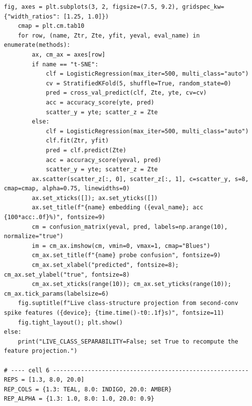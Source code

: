 \begin{lstlisting}[caption={experiments/temporal\_storerecall.ipynb},label={lst:mnn-nb-temporal-storerecall}]
    fig, axes = plt.subplots(3, 2, figsize=(7.5, 9.2), gridspec_kw={"width_ratios": [1.25, 1.0]})
    cmap = plt.cm.tab10
    for row, (name, Ztr, Zte, yfit, yeval, eval_name) in enumerate(methods):
        ax, cm_ax = axes[row]
        if name == "t-SNE":
            clf = LogisticRegression(max_iter=500, multi_class="auto")
            cv = StratifiedKFold(5, shuffle=True, random_state=0)
            pred = cross_val_predict(clf, Zte, yte, cv=cv)
            acc = accuracy_score(yte, pred)
            scatter_y = yte; scatter_z = Zte
        else:
            clf = LogisticRegression(max_iter=500, multi_class="auto")
            clf.fit(Ztr, yfit)
            pred = clf.predict(Zte)
            acc = accuracy_score(yeval, pred)
            scatter_y = yte; scatter_z = Zte
        ax.scatter(scatter_z[:, 0], scatter_z[:, 1], c=scatter_y, s=8, cmap=cmap, alpha=0.75, linewidths=0)
        ax.set_xticks([]); ax.set_yticks([])
        ax.set_title(f"{name} embedding ({eval_name}; acc {100*acc:.0f}%)", fontsize=9)
        cm = confusion_matrix(yeval, pred, labels=np.arange(10), normalize="true")
        im = cm_ax.imshow(cm, vmin=0, vmax=1, cmap="Blues")
        cm_ax.set_title(f"{name} probe confusion", fontsize=9)
        cm_ax.set_xlabel("predicted", fontsize=8); cm_ax.set_ylabel("true", fontsize=8)
        cm_ax.set_xticks(range(10)); cm_ax.set_yticks(range(10)); cm_ax.tick_params(labelsize=6)
    fig.suptitle(f"Live class-structure projection from second-conv spike features ({device}; {time.time()-t0:.1f}s)", fontsize=11)
    fig.tight_layout(); plt.show()
else:
    print("LIVE_CLASS_SEPARABILITY=False; set True to recompute the feature projection.")

# ---- cell 6 --------------------------------------------------------
REPS = [1.3, 8.0, 20.0]
REP_COLS = {1.3: TEAL, 8.0: INDIGO, 20.0: AMBER}
REP_ALPHA = {1.3: 1.0, 8.0: 1.0, 20.0: 0.9}



\end{lstlisting}

